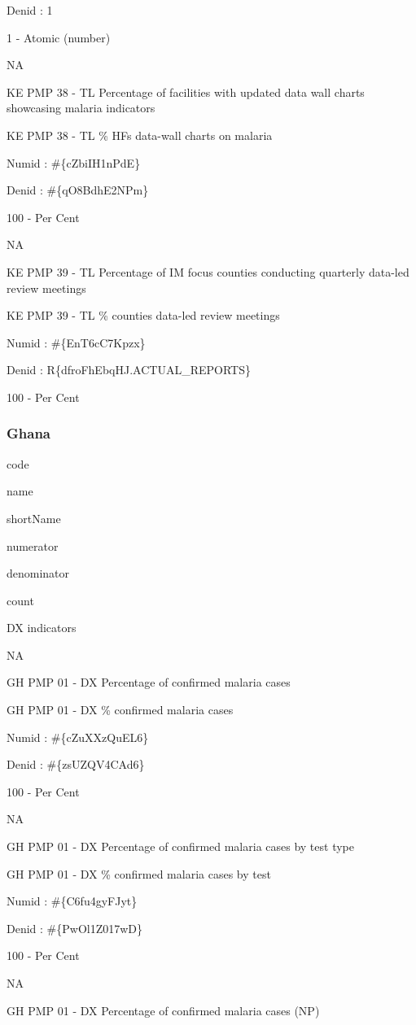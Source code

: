 \documentclass[]{book}
\begin{document}
Denid : 1

1 - Atomic (number)

NA

KE PMP 38 - TL Percentage of facilities with updated data wall charts showcasing malaria indicators

KE PMP 38 - TL \% HFs data-wall charts on malaria

Numid : \#\{cZbiIH1nPdE\}

Denid : \#\{qO8BdhE2NPm\}

100 - Per Cent

NA

KE PMP 39 - TL Percentage of IM focus counties conducting quarterly data-led review meetings

KE PMP 39 - TL \% counties data-led review meetings

Numid : \#\{EnT6cC7Kpzx\}

Denid : R\{dfroFhEbqHJ.ACTUAL\_REPORTS\}

100 - Per Cent

\hypertarget{ghana}{%
\subsubsection{Ghana}\label{ghana}}

code

name

shortName

numerator

denominator

count

DX indicators

NA

GH PMP 01 - DX Percentage of confirmed malaria cases

GH PMP 01 - DX \% confirmed malaria cases

Numid : \#\{cZuXXzQuEL6\}

Denid : \#\{zsUZQV4CAd6\}

100 - Per Cent

NA

GH PMP 01 - DX Percentage of confirmed malaria cases by test type

GH PMP 01 - DX \% confirmed malaria cases by test

Numid : \#\{C6fu4gyFJyt\}

Denid : \#\{PwOl1Z017wD\}

100 - Per Cent

NA

GH PMP 01 - DX Percentage of confirmed malaria cases (NP)
\end{document}
